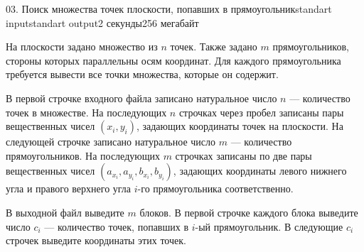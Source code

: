 \begin{problem}{03. Поиск множества точек плоскости, попавших в прямоугольник}{standart input}{standart output}{2 секунды}{256 мегабайт}

На плоскости задано множество из $n$ точек. Также задано $m$ прямоугольников, стороны которых параллельны осям координат. Для каждого прямоугольника требуется вывести все точки множества, которые он содержит.

\InputFile

В первой строчке входного файла записано натуральное число $n$ --- количество точек в множестве. На последующих $n$ строчках через пробел записаны пары вещественных чисел $(x_i, y_i)$, задающих координаты точек на плоскости.
На следующей строчке записано натуральное число $m$ --- количество прямоугольников. На последующих $m$ строчках записаны по две пары вещественных чисел $(a_{x_i}, a_{y_i}, b_{x_i}, b_{y_i})$, задающих координаты левого нижнего угла и правого верхнего угла $i$-го прямоугольника соответственно.

\OutputFile

В выходной файл выведите $m$ блоков. В первой строчке каждого блока выведите число $c_i$ --- количество точек, попавших в $i$-ый прямоугольник. В следующие $c_i$ строчек выведите координаты этих точек.

\Examples

\begin{example}%
%
\end{example}

\end{problem}
